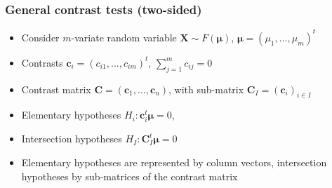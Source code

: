 \documentclass[bigger]{beamer}
\newcommand{\bs}[1]{\bm{#1}}
\begin{document}



% 



% 



\begin{frame}
\frametitle{General contrast tests (two-sided)}
\begin{itemize}

\item Consider $m$-variate random variable $\bs{X} \sim F(\bs{\mu})$, $\bs{\mu} = (\mu_1,...,\mu_m)^t$

\item Contrasts $\bs{c}_i = (c_{i1},...,c_{im})^t$, $\sum_{j = 1}^m
 c_{ij} = 0$
\item Contrast matrix  $\bs{C} = \left( \bs{c}_1,...,\bs{c}_n\right)$,
 with sub-matrix $\bs{C}_I = \left( \bs{c}_i \right)_{i \in
   I}$
\item Elementary hypotheses $H_i: \bs{c}_i^t\bs{\mu} = 0$,
\item Intersection hypotheses $H_I: \bs{C}_I^t\bs{\mu} = 0$

\item Elementary hypotheses are represented by column vectors,
 intersection hypotheses by sub-matrices of the contrast matrix

\end{itemize} %
\end{frame}
\end{document}
